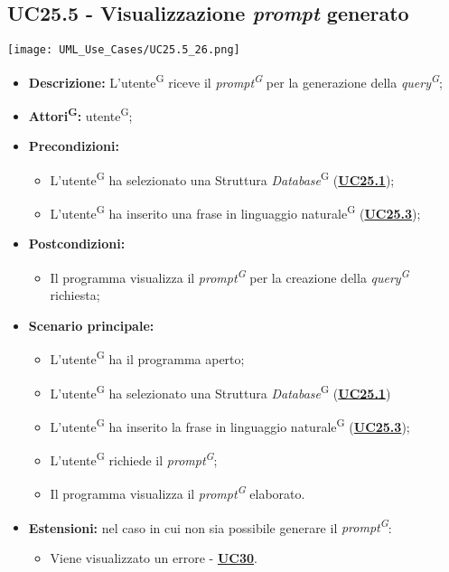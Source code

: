 \subsection{UC25.5 - Visualizzazione \textit{prompt} generato}
\label{sec:UC25.5}
\texttt{[image: UML\_Use\_Cases/UC25.5\_26.png]}
\begin{itemize}
	\item \textbf{Descrizione:} L’utente\textsuperscript{G} riceve il \textit{prompt\textsuperscript{G}} per la generazione della \textit{query\textsuperscript{G}};
	\item \textbf{Attori\textsuperscript{G}:} utente\textsuperscript{G};
	\item \textbf{Precondizioni:} 
	\begin{itemize}
		\item L’utente\textsuperscript{G} ha selezionato una Struttura \textit{Database}\textsuperscript{G} (\hyperref[sec:UC25.1]{\textbf{UC25.1}});
		\item L’utente\textsuperscript{G} ha inserito una frase in linguaggio naturale\textsuperscript{G} (\hyperref[sec:UC25.3]{\textbf{UC25.3}});
	\end{itemize}
	\item \textbf{Postcondizioni:} 
	\begin{itemize}
		\item Il programma visualizza il \textit{prompt\textsuperscript{G}} per la creazione della \textit{query\textsuperscript{G}} richiesta;
	\end{itemize}
	\item \textbf{Scenario principale:} 
	\begin{itemize}
		\item L’utente\textsuperscript{G} ha il programma aperto;
		\item L’utente\textsuperscript{G} ha selezionato una Struttura \textit{Database}\textsuperscript{G} (\hyperref[sec:UC25.1]{\textbf{UC25.1}})
		\item L'utente\textsuperscript{G} ha inserito la frase in linguaggio naturale\textsuperscript{G} (\hyperref[sec:UC25.3]{\textbf{UC25.3}});
		\item L’utente\textsuperscript{G} richiede il \textit{prompt\textsuperscript{G}};
		\item Il programma visualizza il \textit{prompt\textsuperscript{G}} elaborato.
	\end{itemize}
	\item \textbf{Estensioni:} nel caso in cui non sia possibile generare il \textit{prompt\textsuperscript{G}}:
	\begin{itemize}
		\item Viene visualizzato un errore - \hyperref[sec:UC30]{\textbf{UC30}}.
	\end{itemize}
\end{itemize}

